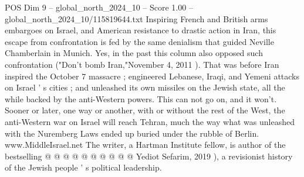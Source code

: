 \begin{textsample}{POS Dim 9 – global\_north\_2024\_10 – Score 1.00 – global\_north\_2024\_10/115819644.txt}
Inspiring French and British arms embargoes on Israel, and American resistance to drastic action in Iran, this escape from confrontation is fed by the same denialism that guided Neville Chamberlain in Munich.
Yes, in the past this column also opposed such confrontation ("Don't bomb Iran,"November 4, 2011 ).
That was before Iran inspired the October 7 massacre ; engineered Lebanese, Iraqi, and Yemeni attacks on Israel ' s cities ; and unleashed its own missiles on the Jewish state, all the while backed by the anti-Western powers.
This can not go on, and it won't.
Sooner or later, one way or another, with or without the rest of the West, the anti-Western war on Israel will reach Tehran, much the way what was unleashed with the Nuremberg Laws ended up buried under the rubble of Berlin. www.MiddleIsrael.net The writer, a Hartman Institute fellow, is author of the bestselling @ @ @ @ @ @ @ @ @ @ Yediot Sefarim, 2019 ), a revisionist history of the Jewish people ' s political leadership.

\end{textsample}
